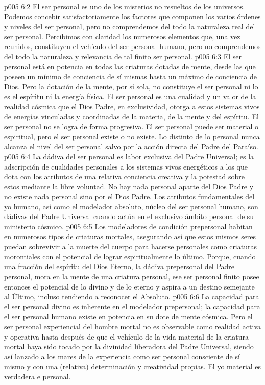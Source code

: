 \vs p005 6:2 \pc El ser personal es uno de los misterios no resueltos de los universos. Podemos concebir satisfactoriamente los factores que componen los varios órdenes y niveles del ser personal, pero no comprendemos del todo la naturaleza real del ser personal. Percibimos con claridad los numerosos elementos que, una vez reunidos, constituyen el vehículo del ser personal humano, pero no comprendemos del todo la naturaleza y relevancia de tal finito ser personal.
\vs p005 6:3 El ser personal está en potencia en todas las criaturas dotadas de mente, desde las que poseen un mínimo de conciencia de sí mismas hasta un máximo de conciencia de Dios. Pero la dotación de la mente, por sí sola, no constituye el ser personal ni lo es el espíritu ni la energía física. El ser personal es una cualidad y un valor de la realidad cósmica que el Dios Padre, en exclusividad, otorga a estos sistemas vivos de energías vinculadas y coordinadas de la materia, de la mente y del espíritu. El ser personal no se logra de forma progresiva. El ser personal puede ser material o espiritual, pero el ser personal existe o no existe. Lo distinto de lo personal nunca alcanza el nivel del ser personal salvo por la acción directa del Padre del Paraíso.
\vs p005 6:4 La dádiva del ser personal es labor exclusiva del Padre Universal; es la adscripción de cualidades personales a los sistemas vivos energéticos a los que dota con los atributos de una relativa conciencia creativa y la potestad sobre estos mediante la libre voluntad. No hay nada personal aparte del Dios Padre y no existe nada personal sino por el Dios Padre. Los atributos fundamentales del yo humano, así como el modelador absoluto, núcleo del ser personal humano, son dádivas del Padre Universal cuando actúa en el exclusivo ámbito personal de su ministerio cósmico.
\vs p005 6:5 \pc Los modeladores de condición prepersonal habitan en numerosos tipos de criaturas mortales, asegurando así que estos mismos seres puedan sobrevivir a la muerte del cuerpo para hacerse personales como criaturas morontiales con el potencial de lograr espiritualmente lo último. Porque, cuando una fracción del espíritu del Dios Eterno, la dádiva prepersonal del Padre personal, mora en la mente de una criatura personal, ese ser personal finito posee entonces el potencial de lo divino y de lo eterno y aspira a un destino semejante al Último, incluso tendiendo a reconocer el Absoluto.
\vs p005 6:6 La capacidad para el ser personal divino es inherente en el modelador prepersonal; la capacidad para el ser personal humano existe en potencia en su dote de mente cósmica. Pero el ser personal experiencial del hombre mortal no es observable como realidad activa y operativa hasta después de que el vehículo de la vida material de la criatura mortal haya sido tocado por la divinidad liberadora del Padre Universal, siendo así lanzado a los mares de la experiencia como ser personal consciente de sí mismo y con una (relativa) determinación y creatividad propias. El yo material es verdadera e  personal.
